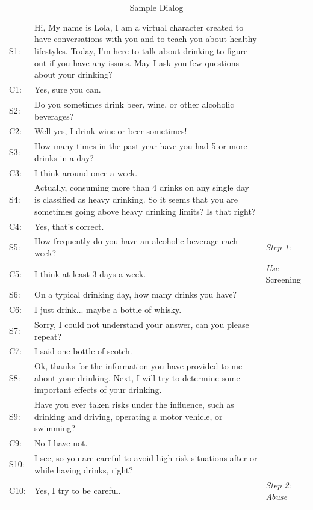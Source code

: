 \begin{sloppy}
\begin{table}
\caption{Sample Dialog}
\label{sampleDialog}
\begin{tabular}{ | l | p{13.5cm} | p{19mm} |}
\hline
S1: & Hi, My name is Lola,  I am a virtual character created to have conversations with you and to teach you about healthy lifestyles. Today, I'm here to talk about drinking to figure out if you have any issues.  May I ask you few questions about your drinking? &     \\
    C1: & Yes, sure you can. &  \\
    S2: & Do you sometimes drink beer, wine, or other alcoholic beverages? &     \\ 
    C2: & Well yes, I drink wine or beer sometimes! &    \\ 
    S3: & How many times in the past year have you had 5 or more drinks in a day? &  \\ 
	C3: & I think around once a week. &    \\ 
	S4: & Actually, consuming more than 4 drinks on any single day is classified as heavy drinking. So it seems that you are sometimes going above heavy drinking limits? Is that right? &  \\
	C4: & Yes, that's correct. & \\
	S5: &  How frequently do you have an alcoholic beverage each week? &    {\em Step 1}:   \\ 
	C5: & I think at least 3 days a week.  &  {\em Use} Screening \\ 
	S6: & On a typical drinking day, how many drinks you have? &    \\ 
	C6: & I just drink... maybe a bottle of whisky. &    \\ 
	S7: & Sorry, I could not understand your answer, can you please repeat? & \\
	C7: & I said one bottle of scotch. & \\
	S8: & Ok, thanks for the information you have provided to me about your drinking. Next, I will try to determine some important effects of your drinking. &  \\ \hline
	S9: & Have you ever taken risks under the influence, such as drinking and driving, operating a motor vehicle, or swimming? &    \\
	C9: & No I have not. &  \\
	S10: & I see, so you are careful to avoid high risk situations after or while having drinks, right? & \\
	C10: & Yes, I try to be careful. &  {\em Step 2}: {\em Abuse}   \\

\end{tabular}
\end{table}
\end{sloppy}
